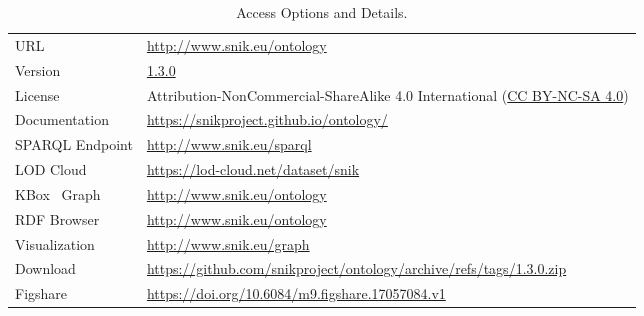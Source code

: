 \documentclass{IOS-Book-Article}     %
\newcommand{\citep}{\cite}%
\newcommand{\snikversion}{1.3.0}
\newcommand{\snikversionlink}{\href{https://github.com/snikproject/ontology/releases/tag/\snikversion}{\snikversion}}
\newcommand{\sniktriples}{81499}
\newcommand{\snikclasses}{4107}
\newcommand{\snikproperties}{65}
\newcommand{\sniklinks}{579}
\begin{document}
\begin{table}
\caption{Access Options and Details.%
}
\label{tab:access}
\begin{tabulary}{\columnwidth}{lL}
\toprule
URL						&\url{http://www.snik.eu/ontology}\\
Version					&\snikversionlink{}\\
License					&Attribution-NonCommercial-ShareAlike 4.0 International (\href{https://creativecommons.org/licenses/by-nc-sa/4.0/}{CC BY-NC-SA 4.0})\\
Documentation	&\url{https://snikproject.github.io/ontology/}\\
SPARQL Endpoint			&\url{http://www.snik.eu/sparql}\\
LOD Cloud				&\url{https://lod-cloud.net/dataset/snik}\\
KBox~\cite{kbox} Graph	&\url{http://www.snik.eu/ontology}\\
RDF Browser				&\url{http://www.snik.eu/ontology}\\
Visualization			&\url{http://www.snik.eu/graph}\\
Download				&\url{https://github.com/snikproject/ontology/archive/refs/tags/\snikversion.zip}\\
Figshare				&\url{https://doi.org/10.6084/m9.figshare.17057084.v1}\\
\bottomrule
\end{tabulary}%
\end{table}

\end{document}
